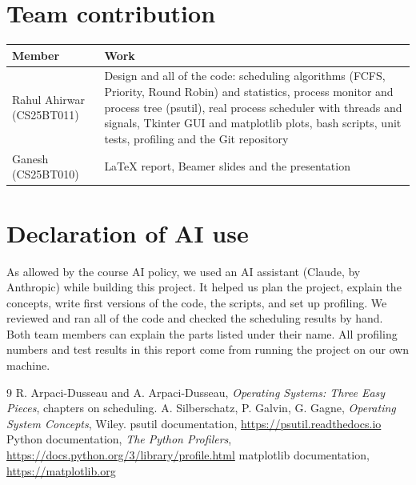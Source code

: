 \documentclass[11pt,a4paper]{article}
\begin{document}
\section{Team contribution}
\begin{table}[H]
\centering
\begin{tabular}{lp{10cm}}
\toprule
Member & Work \\
\midrule
Rahul Ahirwar (CS25BT011) & Design and all of the code: scheduling algorithms (FCFS,
  Priority, Round Robin) and statistics, process monitor and process tree (psutil), real
  process scheduler with threads and signals, Tkinter GUI and matplotlib plots, bash
  scripts, unit tests, profiling and the Git repository \\
Ganesh (CS25BT010) & \LaTeX{} report, Beamer slides and the presentation \\
\bottomrule
\end{tabular}
\end{table}

\section{Declaration of AI use}
As allowed by the course AI policy, we used an AI assistant (Claude, by Anthropic) while
building this project. It helped us plan the project, explain the concepts, write first
versions of the code, the scripts, and set up profiling. We reviewed and
ran all of the code and checked the scheduling results by hand. Both team members
can explain the parts listed under their name. All profiling numbers and test results in this report come from running the project on our own machine.

\begin{thebibliography}{9}
 R. Arpaci-Dusseau and A. Arpaci-Dusseau, \emph{Operating Systems: Three Easy Pieces}, chapters on scheduling.
 A. Silberschatz, P. Galvin, G. Gagne, \emph{Operating System Concepts}, Wiley.
 psutil documentation, \url{https://psutil.readthedocs.io}
 Python documentation, \emph{The Python Profilers}, \url{https://docs.python.org/3/library/profile.html}
 matplotlib documentation, \url{https://matplotlib.org}
\end{thebibliography}
\end{document}
